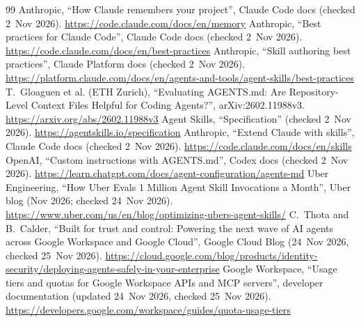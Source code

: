 \documentclass[10pt]{article}
\begin{document}
\begin{thebibliography}{99}
 Anthropic, ``How Claude remembers your project'', Claude Code docs (checked 2~Nov 2026). \url{https://code.claude.com/docs/en/memory}
 Anthropic, ``Best practices for Claude Code'', Claude Code docs (checked 2~Nov 2026). \url{https://code.claude.com/docs/en/best-practices}
 Anthropic, ``Skill authoring best practices'', Claude Platform docs (checked 2~Nov 2026). \url{https://platform.claude.com/docs/en/agents-and-tools/agent-skills/best-practices}
 T.~Gloaguen et al. (ETH Zurich), ``Evaluating AGENTS.md: Are Repository-Level Context Files Helpful for Coding Agents?'', arXiv:2602.11988v3. \url{https://arxiv.org/abs/2602.11988v3}
 Agent Skills, ``Specification'' (checked 2~Nov 2026). \url{https://agentskills.io/specification}
 Anthropic, ``Extend Claude with skills'', Claude Code docs (checked 2~Nov 2026). \url{https://code.claude.com/docs/en/skills}
 OpenAI, ``Custom instructions with AGENTS.md'', Codex docs (checked 2~Nov 2026). \url{https://learn.chatgpt.com/docs/agent-configuration/agents-md}
 Uber Engineering, ``How Uber Evals 1 Million Agent Skill Invocations a Month'', Uber blog (Nov 2026; checked 24~Nov 2026). \url{https://www.uber.com/us/en/blog/optimizing-ubers-agent-skills/}
 C.~Thota and B.~Calder, ``Built for trust and control: Powering the next wave of AI agents across Google Workspace and Google Cloud'', Google Cloud Blog (24~Nov 2026, checked 25~Nov 2026). \url{https://cloud.google.com/blog/products/identity-security/deploying-agents-safely-in-your-enterprise}
 Google Workspace, ``Usage tiers and quotas for Google Workspace APIs and MCP servers'', developer documentation (updated 24~Nov 2026, checked 25~Nov 2026). \url{https://developers.google.com/workspace/guides/quota-usage-tiers}

\end{thebibliography}
\end{document}
